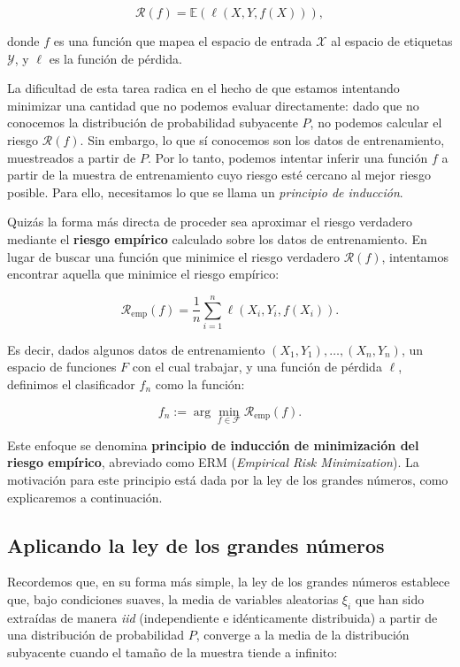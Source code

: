 \documentclass{report}
\begin{document}
\[
\mathcal{R}(f) = \mathbb{E}(\ell(X, Y, f(X))),
\]

donde \(f\) es una función que mapea el espacio de entrada \(\mathcal{X}\) al espacio de etiquetas \(\mathcal{Y}\), y \(\ell\)
es la función de pérdida.

La dificultad de esta tarea radica en el hecho de que estamos intentando minimizar una cantidad que no
podemos evaluar directamente: dado que no conocemos la distribución de probabilidad subyacente \(P\),
no podemos calcular el riesgo \(\mathcal{R}(f)\). Sin embargo, lo que sí conocemos son los datos de entrenamiento,
muestreados a partir de \(P\). Por lo tanto, podemos intentar inferir una función \(f\) a partir de la muestra
de entrenamiento cuyo riesgo esté cercano al mejor riesgo posible. Para ello, necesitamos lo que se llama
un \textit{principio de inducción}.

Quizás la forma más directa de proceder sea aproximar el riesgo verdadero mediante el \textbf{riesgo empírico}
calculado sobre los datos de entrenamiento. En lugar de buscar una función que minimice el riesgo verdadero
\(\mathcal{R}(f)\), intentamos encontrar aquella que minimice el riesgo empírico:

\[
\mathcal{R}_{\text{emp}}(f) = \frac{1}{n} \sum_{i=1}^{n} \ell(X_i, Y_i, f(X_i)).
\]

Es decir, dados algunos datos de entrenamiento \((X_1, Y_1), \dots, (X_n, Y_n)\), un espacio de funciones
\(F\) con el cual trabajar, y una función de pérdida \(\ell\), definimos el clasificador \(f_n\) como la función:

\[
f_n := \arg\min_{f \in \mathcal{F}} \mathcal{R}_{\text{emp}}(f).
\]

Este enfoque se denomina \textbf{principio de inducción de minimización del riesgo empírico}, abreviado como
ERM (\textit{Empirical Risk Minimization}). La motivación para este principio está dada por la ley de los
grandes números, como explicaremos a continuación.

\subsection{Aplicando la ley de los grandes números}

Recordemos que, en su forma más simple, la ley de los grandes números
establece que, bajo condiciones suaves, la media de variables aleatorias \(\xi_i\) que han sido extraídas
de manera \textit{iid} (independiente e idénticamente distribuida) a partir de una distribución de probabilidad
\(P\), converge a la media de la distribución subyacente cuando el tamaño de la muestra tiende a infinito:
\end{document}
